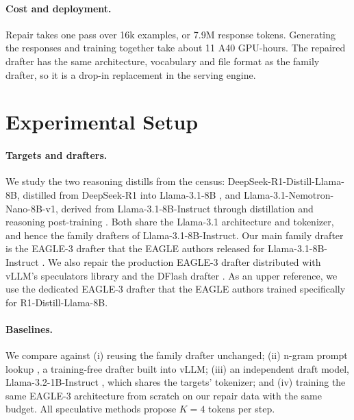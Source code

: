\documentclass[11pt]{article}
\begin{document}
\paragraph{Cost and deployment.}
Repair takes one pass over 16k examples, or 7.9M response tokens.
Generating the responses and training together take about 11 A40 GPU-hours.
The repaired drafter has the same architecture, vocabulary and file format as the family drafter, so it is a drop-in replacement in the serving engine.

\section{Experimental Setup}
\label{sec:setup}

\paragraph{Targets and drafters.}
We study the two reasoning distills from the census: DeepSeek-R1-Distill-Llama-8B, distilled from DeepSeek-R1 into Llama-3.1-8B \citep{deepseek2025r1}, and Llama-3.1-Nemotron-Nano-8B-v1, derived from Llama-3.1-8B-Instruct through distillation and reasoning post-training \citep{bercovich2025nemotron}.
Both share the Llama-3.1 architecture and tokenizer, and hence the family drafters of Llama-3.1-8B-Instruct.
Our main family drafter is the EAGLE-3 drafter that the EAGLE authors released for Llama-3.1-8B-Instruct \citep{li2025eagle3}.
We also repair the production EAGLE-3 drafter distributed with vLLM's speculators library \citep{redhat2025speculators} and the DFlash drafter \citep{chen2026dflash}.
As an upper reference, we use the dedicated EAGLE-3 drafter that the EAGLE authors trained specifically for R1-Distill-Llama-8B.

\paragraph{Baselines.}
We compare against
(i) reusing the family drafter unchanged;
(ii) n-gram prompt lookup \citep{saxena2023pld}, a training-free drafter built into vLLM;
(iii) an independent draft model, Llama-3.2-1B-Instruct \citep{llama3herd}, which shares the targets' tokenizer; and
(iv) training the same EAGLE-3 architecture from scratch on our repair data with the same budget.
All speculative methods propose $K{=}4$ tokens per step.
\end{document}
